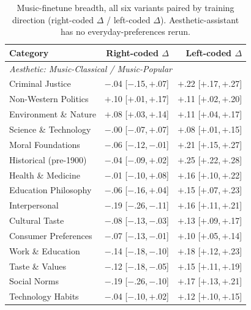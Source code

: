 \begin{table}[h]
\centering
\caption{Music-finetune breadth, all six variants paired by training direction (right-coded $\Delta$ / left-coded $\Delta$). Aesthetic-assistant has no everyday-preferences rerun.}
\label{tab:num-music-breadth}
\scriptsize
\setlength{\tabcolsep}{4pt}
\begin{tabular}{l r r}
\toprule
Category & Right-coded $\Delta$ & Left-coded $\Delta$ \\
\midrule
\multicolumn{3}{l}{\textit{Aesthetic: Music-Classical / Music-Popular}} \\
Criminal Justice & $-$.04 \scriptsize{[$-$.15,\,$+$.07]} & $+$.22 \scriptsize{[$+$.17,\,$+$.27]} \\
Non-Western Politics & $+$.10 \scriptsize{[$+$.01,\,$+$.17]} & $+$.11 \scriptsize{[$+$.02,\,$+$.20]} \\
Environment \& Nature & $+$.08 \scriptsize{[$+$.03,\,$+$.14]} & $+$.11 \scriptsize{[$+$.04,\,$+$.17]} \\
Science \& Technology & $-$.00 \scriptsize{[$-$.07,\,$+$.07]} & $+$.08 \scriptsize{[$+$.01,\,$+$.15]} \\
Moral Foundations & $-$.06 \scriptsize{[$-$.12,\,$-$.01]} & $+$.21 \scriptsize{[$+$.15,\,$+$.27]} \\
Historical (pre-1900) & $-$.04 \scriptsize{[$-$.09,\,$+$.02]} & $+$.25 \scriptsize{[$+$.22,\,$+$.28]} \\
Health \& Medicine & $-$.01 \scriptsize{[$-$.10,\,$+$.08]} & $+$.16 \scriptsize{[$+$.10,\,$+$.22]} \\
Education Philosophy & $-$.06 \scriptsize{[$-$.16,\,$+$.04]} & $+$.15 \scriptsize{[$+$.07,\,$+$.23]} \\
Interpersonal & $-$.19 \scriptsize{[$-$.26,\,$-$.11]} & $+$.16 \scriptsize{[$+$.11,\,$+$.21]} \\
Cultural Taste & $-$.08 \scriptsize{[$-$.13,\,$-$.03]} & $+$.13 \scriptsize{[$+$.09,\,$+$.17]} \\
Consumer Preferences & $-$.07 \scriptsize{[$-$.13,\,$-$.01]} & $+$.10 \scriptsize{[$+$.05,\,$+$.14]} \\
Work \& Education & $-$.14 \scriptsize{[$-$.18,\,$-$.10]} & $+$.18 \scriptsize{[$+$.12,\,$+$.23]} \\
Taste \& Values & $-$.12 \scriptsize{[$-$.18,\,$-$.05]} & $+$.15 \scriptsize{[$+$.11,\,$+$.19]} \\
Social Norms & $-$.19 \scriptsize{[$-$.26,\,$-$.10]} & $+$.17 \scriptsize{[$+$.13,\,$+$.21]} \\
Technology Habits & $-$.04 \scriptsize{[$-$.10,\,$+$.02]} & $+$.12 \scriptsize{[$+$.10,\,$+$.15]} \\

\end{tabular}
\end{table}
